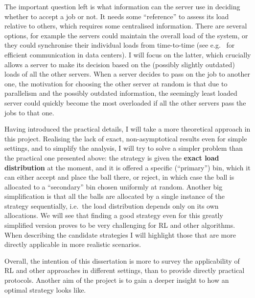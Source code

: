 The important question left is what information can the server use in deciding whether to accept a job or not. It needs some ``reference'' to assess its load relative to others, which requires some centralised information. There are several options, for example the servers could maintain the overall load of the system, or they could synchronise their individual loads from time-to-time (see e.g.\ \cite{zhang2018datacenterloadbalancing} for efficient communication in data centers). I will focus on the latter, which crucially allows a server to make its decision based on the (possibly slightly outdated) loads of all the other servers. When a server decides to pass on the job to another one, the motivation for choosing the other server at random is that due to parallelism and the possibly outdated information, the seemingly least loaded server could quickly become the most overloaded if all the other servers pass the jobs to that one.


Having introduced the practical details, I will take a more theoretical approach in this project. Realising the lack of exact, non-asymptotical results even for simple settings, and to simplify the analysis, I will try to solve a simpler problem than the practical one presented above: the strategy is given the \textbf{exact load distribution} at the moment, and it is offered a specific (``primary'') bin, which it can either accept and place the ball there, or reject, in which case the ball is allocated to a ``secondary'' bin chosen uniformly at random. Another big simplification is that all the balls are allocated by a single instance of the strategy sequentially, i.e.\ the load distribution depends only on its own allocations. We will see that finding a good strategy even for this greatly simplified version proves to be very challenging for RL and other algorithms. When describing the candidate strategies I will highlight those that are more directly applicable in more realistic scenarios. 


Overall, the intention of this dissertation is more to survey the applicability of RL and other approaches in different settings, than to provide directly practical protocols. Another aim of the project is to gain a deeper insight to how an optimal strategy looks like.

